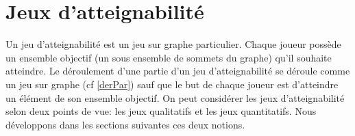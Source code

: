 
\section{Jeux d'atteignabilité}
\label{sect:jeuxAtt}

Un jeu d'atteignabilité est un jeu sur graphe particulier. Chaque joueur possède un ensemble objectif (un sous ensemble de sommets du graphe) qu'il souhaite atteindre. Le déroulement d'une partie d'un jeu d'atteignabilité se déroule comme un jeu sur graphe (cf \ref{derPar}) sauf que le but de chaque joueur est d'atteindre un élément de son ensemble objectif. On peut considérer les jeux d'atteignabilité selon deux points de vue: les jeux qualitatifs et les jeux quantitatifs. Nous développons dans les sections suivantes ces deux notions.





